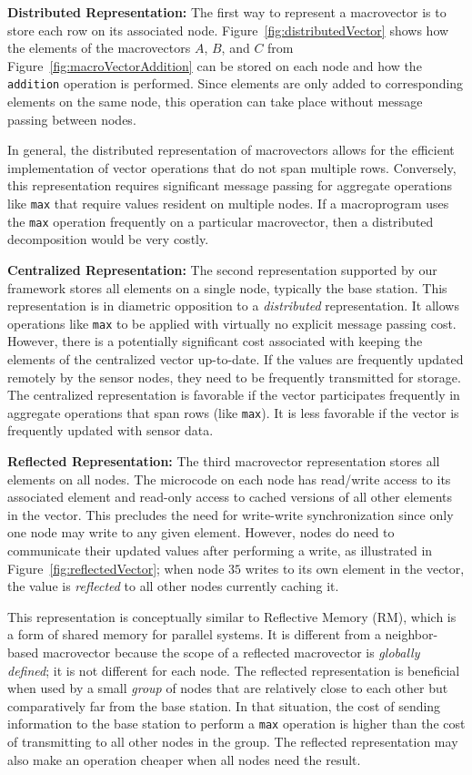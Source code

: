 {\bf Distributed Representation:} The first way to represent a macrovector is to
store each row on its associated node.  Figure~\ref{fig:distributedVector} shows
how the elements of the macrovectors $A$, $B$, and $C$ from
Figure~\ref{fig:macroVectorAddition} can be stored on each node and how the {\tt
  addition} operation is performed. Since elements are only added to
corresponding elements on the same node, this operation can take place without
message passing between nodes.

In general, the distributed representation of macrovectors allows for the
efficient implementation of vector operations that do not span multiple rows.
Conversely, this representation requires significant message passing for
aggregate operations like {\tt max} that require values resident on multiple
nodes. If a macroprogram uses the {\tt max} operation frequently on a particular
macrovector, then a distributed decomposition would be very costly.

{\bf Centralized Representation:} The second representation supported
by our framework stores all elements on a single node, typically the
base station. This representation is in diametric opposition to a
\emph{distributed} representation. It allows operations like {\tt max}
to be applied with virtually no explicit message passing cost.
However, there is a potentially significant cost associated with keeping
the elements of the centralized vector up-to-date. If the values are
frequently updated remotely by the sensor nodes, they need to be
frequently transmitted for storage. The centralized
representation is favorable if the vector participates frequently in
aggregate operations that span rows (like {\tt max}). It is less
favorable if the vector is frequently updated with
sensor data.

{\bf Reflected Representation:} The third macrovector representation stores all
elements on all nodes. The microcode on each node has read/write access to its
associated element and read-only access to cached versions of all other elements
in the vector. This precludes the need for write-write synchronization since
only one node may write to any given element. However, nodes do need to
communicate their updated values after performing a write, as illustrated in
Figure~\ref{fig:reflectedVector}; when node $35$ writes to its own element in
the vector, the value is {\em reflected} to all other nodes currently caching
it.

This representation is conceptually similar to Reflective Memory (RM), which is
a form of shared memory for parallel systems\cite{Jovanovic}.  It is different
from a neighbor-based macrovector because the scope of a reflected macrovector
is {\em globally defined}; it is not different for each node.  The reflected
representation is beneficial when used by a small {\em group} of nodes that are
relatively close to each other but comparatively far from the base station. In
that situation, the cost of sending information to the base station to perform a
{\tt max} operation is higher than the cost of transmitting to all other nodes
in the group. The reflected representation may also make an operation cheaper
when all nodes need the result.

